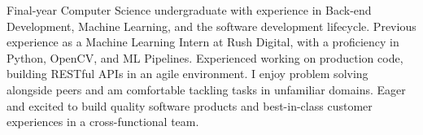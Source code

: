 

\begin{cvparagraph}

Final-year Computer Science undergraduate with experience in Back-end Development, Machine Learning, and the software development lifecycle. Previous experience as a Machine Learning Intern at Rush Digital, with a proficiency in Python, OpenCV, and ML Pipelines. Experienced working on production code, building RESTful APIs in an agile environment. I enjoy problem solving alongside peers and am comfortable tackling tasks in unfamiliar domains. Eager and excited to build quality software products and best-in-class customer experiences in a cross-functional team. 
\end{cvparagraph}
